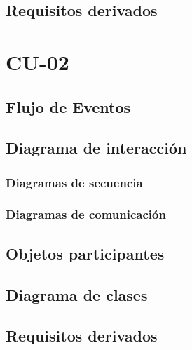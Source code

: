 \documentclass[12pt, a4paper, titlepage]{article}
\begin{document}
\subsection{Requisitos derivados}

\section{CU-02 }


\subsection{Flujo de Eventos}



\subsection{Diagrama de interacción}



\subsubsection{Diagramas de secuencia}  



\subsubsection{Diagramas de comunicación}  


\subsection{Objetos participantes}

\subsection{Diagrama de clases}



\subsection{Requisitos derivados}
\end{document}
